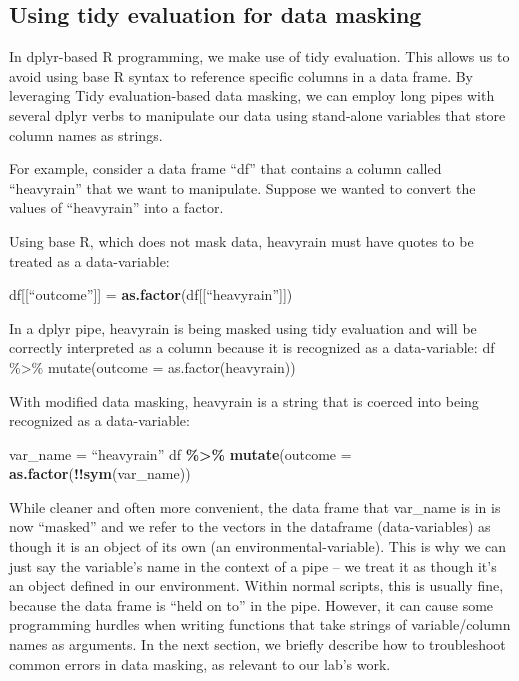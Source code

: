 \documentclass[
]{book}
\newenvironment{Shaded}{\begin{snugshade}}{\end{snugshade}}
\newcommand{\AttributeTok}[1]{\textcolor[rgb]{0.13,0.29,0.53}{#1}}
\newcommand{\FunctionTok}[1]{\textcolor[rgb]{0.13,0.29,0.53}{\textbf{#1}}}
\newcommand{\NormalTok}[1]{#1}
\newcommand{\OtherTok}[1]{\textcolor[rgb]{0.56,0.35,0.01}{#1}}
\newcommand{\SpecialCharTok}[1]{\textcolor[rgb]{0.81,0.36,0.00}{\textbf{#1}}}
\begin{document}
\subsection{Using tidy evaluation for data masking}\label{using-tidy-evaluation-for-data-masking}

In dplyr-based R programming, we make use of tidy evaluation. This allows us to avoid using base R syntax to reference specific columns in a data frame. By leveraging Tidy evaluation-based data masking, we can employ long pipes with several dplyr verbs to manipulate our data using stand-alone variables that store column names as strings.

For example, consider a data frame ``df'' that contains a column called ``heavyrain'' that we want to manipulate. Suppose we wanted to convert the values of ``heavyrain'' into a factor.

Using base R, which does not mask data, heavyrain must have quotes to be treated as a data-variable:

\begin{Shaded}
\begin{Highlighting}[]
\NormalTok{df[[“outcome”]] }\OtherTok{=} \FunctionTok{as.factor}\NormalTok{(df[[“heavyrain”]])}
\end{Highlighting}
\end{Shaded}

In a dplyr pipe, heavyrain is being masked using tidy evaluation and will be correctly interpreted as a column because it is recognized as a data-variable:
df \%\textgreater\% mutate(outcome = as.factor(heavyrain))

With modified data masking, heavyrain is a string that is coerced into being recognized as a data-variable:

\begin{Shaded}
\begin{Highlighting}[]
\NormalTok{var\_name }\OtherTok{=}\NormalTok{ “heavyrain”}
\NormalTok{df }\SpecialCharTok{\%\textgreater{}\%} \FunctionTok{mutate}\NormalTok{(}\AttributeTok{outcome =} \FunctionTok{as.factor}\NormalTok{(}\SpecialCharTok{!!}\FunctionTok{sym}\NormalTok{(var\_name)) }
\end{Highlighting}
\end{Shaded}

While cleaner and often more convenient, the data frame that var\_name is in is now ``masked'' and we refer to the vectors in the dataframe (data-variables) as though it is an object of its own (an environmental-variable). This is why we can just say the variable's name in the context of a pipe -- we treat it as though it's an object defined in our environment. Within normal scripts, this is usually fine, because the data frame is ``held on to'' in the pipe. However, it can cause some programming hurdles when writing functions that take strings of variable/column names as arguments. In the next section, we briefly describe how to troubleshoot common errors in data masking, as relevant to our lab's work.
\end{document}
